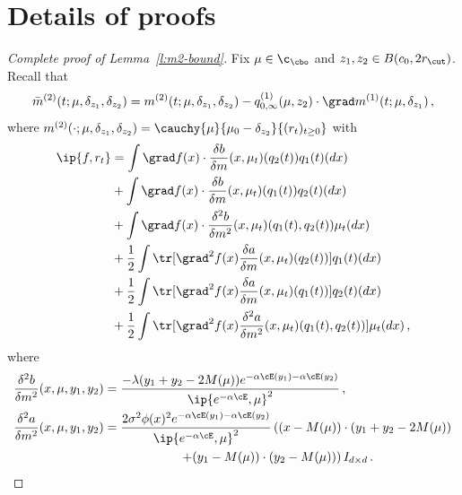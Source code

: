\documentclass{amsart}
\begin{document}



\appendix

\section{Details of proofs}
\label{s:complete-prf}

\begin{proof}[Complete proof of Lemma~\ref{l:m2-bound}]
	\restartsteps
	Fix $\mu \in \c_\cbo$ and $z_1, z_2 \in B(c_0, 2r_\cut)$.
	Recall that 
	\begin{equation*}
		\bar m^{(2)}(t;\mu,\delta_{z_1},\delta_{z_2}) = m^{(2)}(t;\mu,\delta_{z_1},\delta_{z_2}) - q^{(1)}_{0,\infty}(\mu,z_2) \cdot \grad m^{(1)}(t;\mu,\delta_{z_1}) \,,
	\end{equation*}
	where $m^{(2)}(\cdot;\mu,\delta_{z_1},\delta_{z_2}) = \cauchy{\mu}{\mu_0 - \delta_{z_2}}{(r_t)_{t \ge 0}}$ with 
	\begin{align*}
		\ip{f, r_t} & = \int \grad f(x) \cdot \frac{\delta b}{\delta m}(x,\mu_t)(q_2(t)) q_1(t)(dx) \\
		& + \int \grad f(x) \cdot \frac{\delta b}{\delta m}(x,\mu_t)(q_1(t)) q_2(t)(dx) \\
		& + \int \grad f(x) \cdot \frac{\delta^2 b}{\delta m^2}(x,\mu_t)(q_1(t),q_2(t)) \mu_t(dx) \\
		& + \frac{1}{2} \int \tr[ \grad^2 f(x) \frac{\delta a}{\delta m}(x,\mu_t)(q_2(t)) ] q_1(t)(dx) \\
		& + \frac{1}{2} \int \tr[ \grad^2 f(x) \frac{\delta a}{\delta m}(x,\mu_t)(q_1(t)) ] q_2(t)(dx) \\
		& + \frac{1}{2} \int \tr[ \grad^2 f(x) \frac{\delta^2 a}{\delta m^2}(x,\mu_t)(q_1(t),q_2(t)) ] \mu_t(dx) \,,
	\end{align*}
	where
	\begin{align*}
		\frac{\delta^2 b}{\delta m^2} (x,\mu,y_1,y_2) & = \frac{-\lambda (y_1+y_2-2M(\mu)) e^{-\alpha\cE(y_1)-\alpha\cE(y_2)}}{\ip{e^{-\alpha\cE},\mu}^2} \,, \\
		\frac{\delta^2 a}{\delta m^2} (x,\mu,y_1,y_2) & = \frac{2\sigma^2 \phi(x)^2 e^{-\alpha\cE(y_1)-\alpha\cE(y_2)}}{\ip{e^{-\alpha\cE},\mu}^2} \left( (x-M(\mu))\cdot (y_1+y_2-2M(\mu)) \right. \\
		& \qquad \qquad \qquad \left. + (y_1-M(\mu)) \cdot (y_2-M(\mu)) \right) I_{d \times d} \,.
	\end{align*}

\end{proof}
\end{document}
